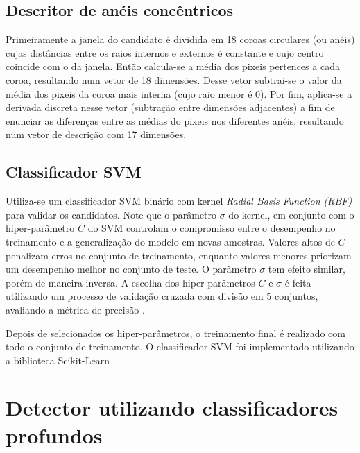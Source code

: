     \subsection{Descritor de anéis concêntricos}
       Primeiramente a janela do candidato é dividida em 18 coroas circulares (ou anéis) cujas distâncias entre os raios internos e externos é constante e cujo centro coincide com o da janela. Então calcula-se a média dos pixeis pertences a cada coroa, resultando num vetor de 18 dimensões. Desse vetor subtrai-se o valor da média dos pixeis da coroa mais interna (cujo raio menor é 0). Por fim, aplica-se a derivada discreta nesse vetor (subtração entre dimensões adjacentes) a fim de enunciar as diferenças entre as médias do pixeis nos diferentes anéis, resultando num vetor de descrição com 17 dimensões.

    \subsection{Classificador SVM}
      Utiliza-se um classificador SVM binário com kernel \textit{Radial Basis Function (RBF)} \cite{rbfkernel} para validar os candidatos. Note que o parâmetro $\sigma$ do kernel, em conjunto com o hiper-parâmetro $C$ do SVM controlam o compromisso entre o desempenho no treinamento e a generalização do modelo em novas amostras. Valores altos de $C$ penalizam erros no conjunto de treinamento, enquanto valores menores priorizam um desempenho melhor no conjunto de teste. O parâmetro $\sigma$ tem efeito similar, porém de maneira inversa. A escolha dos hiper-parâmetros $C$ e $\sigma$ é feita utilizando um processo de validação cruzada com divisão em 5 conjuntos, avaliando a métrica de precisão \cite{evaluationMetrics}.

      Depois de selecionados os hiper-parâmetros, o treinamento final é realizado com todo o conjunto de treinamento. O classificador SVM foi implementado utilizando a biblioteca Scikit-Learn \cite{scikit-learn}.


\section{Detector utilizando classificadores profundos}
\label{sec:deep}

